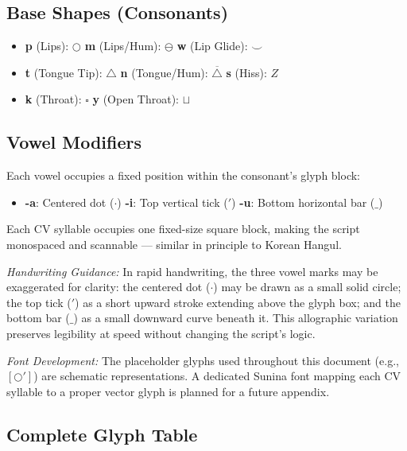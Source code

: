 \documentclass[12pt, a4paper]{article}
\begin{document}
\subsection{Base Shapes (Consonants)}
\begin{itemize}
    \item \textbf{p} (Lips): $\bigcirc$ \quad \textbf{m} (Lips/Hum): $\ominus$ \quad \textbf{w} (Lip Glide): $\smile$
    \item \textbf{t} (Tongue Tip): $\triangle$ \quad \textbf{n} (Tongue/Hum): $\overline{\triangle}$ \quad \textbf{s} (Hiss): $Z$
    \item \textbf{k} (Throat): $\square$ \quad \textbf{y} (Open Throat): $\sqcup$
\end{itemize}

\subsection{Vowel Modifiers}
Each vowel occupies a fixed position within the consonant's glyph block:
\begin{itemize}
    \item \textbf{-a}: Centered dot ($\cdot$) \quad \textbf{-i}: Top vertical tick ($'$) \quad \textbf{-u}: Bottom horizontal bar ($\_$)
\end{itemize}
Each CV syllable occupies one fixed-size square block, making the script monospaced and scannable --- similar in principle to Korean Hangul.

\textit{Handwriting Guidance:} In rapid handwriting, the three vowel marks may be exaggerated for clarity: the centered dot ($\cdot$) may be drawn as a small solid circle; the top tick ($'$) as a short upward stroke extending above the glyph box; and the bottom bar ($\_$) as a small downward curve beneath it. This allographic variation preserves legibility at speed without changing the script's logic.

\textit{Font Development:} The placeholder glyphs used throughout this document (e.g., $[\bigcirc']$) are schematic representations. A dedicated Sunina font mapping each CV syllable to a proper vector glyph is planned for a future appendix.

\subsection{Complete Glyph Table}
\end{document}
